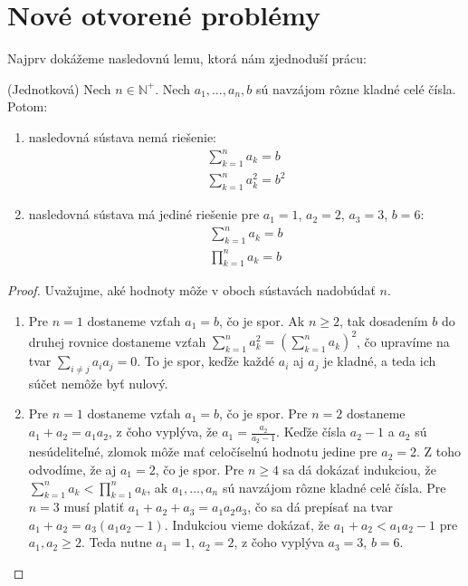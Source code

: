 \chapter{Nové otvorené problémy}

\label{kap:newproblems} %

Najprv dokážeme nasledovnú lemu, ktorá nám zjednoduší prácu:

\begin{lemma}
\label{jedn}
(Jednotková) Nech $n \in \mathbb{N^+}$. Nech $a_1, \dots , a_n , b$ sú navzájom rôzne kladné celé čísla. Potom:

\begin{enumerate}
\item nasledovná sústava nemá riešenie:
\begin{gather*}
\sum_{k=1}^{n} a_k = b \\
\sum_{k=1}^{n} a^2_k = b^2
\end{gather*}

\item nasledovná sústava má jediné riešenie pre $a_1 = 1$, $a_2 = 2$, $a_3 = 3$, $b = 6$:
\begin{gather*}
\sum_{k=1}^{n} a_k = b \\
\prod_{k=1}^{n} a_k = b
\end{gather*}
\end{enumerate}

\end{lemma}

\begin{proof}
Uvažujme, aké hodnoty môže v oboch sústavách nadobúdať $n$.
\begin{enumerate}
\item Pre $n = 1$ dostaneme vzťah $a_1 = b$, čo je spor. Ak $n \geq 2$, tak dosadením $b$ do druhej rovnice dostaneme vzťah $\sum_{k=1}^{n} a^2_k = (\sum_{k=1}^{n} a_k)^2$, čo upravíme na tvar $\sum_{i \neq j} a_i a_j = 0$. To je spor, keďže každé $a_i$ aj $a_j$ je kladné, a teda ich súčet nemôže byť nulový. \\

\item Pre $n = 1$ dostaneme vzťah $a_1 = b$, čo je spor. Pre $n = 2$ dostaneme $a_1 + a_2 = a_1 a_2$, z čoho vyplýva, že $a_1 = \frac{a_2}{a_2 - 1}$. Keďže čísla $a_2 - 1$ a $a_2$ sú nesúdeliteľné, zlomok môže mať celočíselnú hodnotu jedine pre $a_2 = 2$. Z toho odvodíme, že aj $a_1 = 2$, čo je spor. Pre $n \geq 4$ sa dá dokázať indukciou, že $\sum_{k=1}^{n} a_k < \prod_{k=1}^{n} a_k$, ak $a_1, \dots , a_n$ sú navzájom rôzne kladné celé čísla. Pre $n = 3$ musí platiť $a_1 + a_2 + a_3 = a_1 a_2 a_3$, čo sa dá prepísať na tvar $a_1 + a_2 = a_3 (a_1 a_2 - 1)$. Indukciou vieme dokázať, že $a_1 + a_2 < a_1 a_2 - 1$ pre $a_1, a_2 \geq 2$. Teda nutne $a_1 = 1$, $a_2 = 2$, z čoho vyplýva $a_3 = 3$, $b = 6$.
\end{enumerate}
\end{proof}


